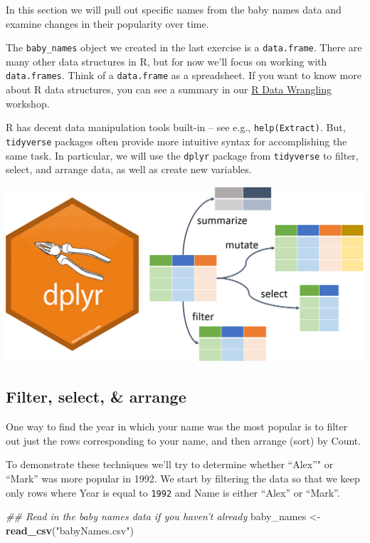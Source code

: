 \documentclass[
]{book}
\newenvironment{Shaded}{\begin{snugshade}}{\end{snugshade}}
\newcommand{\CommentTok}[1]{\textcolor[rgb]{0.56,0.35,0.01}{\textit{#1}}}
\newcommand{\KeywordTok}[1]{\textcolor[rgb]{0.13,0.29,0.53}{\textbf{#1}}}
\newcommand{\NormalTok}[1]{#1}
\newcommand{\StringTok}[1]{\textcolor[rgb]{0.31,0.60,0.02}{#1}}
\begin{document}
In this section we will pull out specific names from the baby names data and
examine changes in their popularity over time.

The \texttt{baby\_names} object we created in the last exercise is a \texttt{data.frame}.
There are many other data structures in R, but for now we'll focus on
working with \texttt{data.frames}. Think of a \texttt{data.frame} as a spreadsheet.
If you want to know more about R data structures, you can see a summary
in our \href{./RDataWrangling.html\#data-types-and-structures}{R Data Wrangling} workshop.

R has decent data manipulation tools built-in -- see e.g.,
\texttt{help(Extract)}. But, \texttt{tidyverse} packages often provide
more intuitive syntax for accomplishing the same task. In
particular, we will use the \texttt{dplyr} package from \texttt{tidyverse}
to filter, select, and arrange data, as well as create new variables.

\includegraphics{R/Rintro/images/dplyr.png}

\hypertarget{filter-select-arrange}{%
\subsection{Filter, select, \& arrange}\label{filter-select-arrange}}

One way to find the year in which your name was the most popular
is to filter out just the rows corresponding to your name, and
then arrange (sort) by Count.

To demonstrate these techniques we'll try to determine whether
``Alex''" or ``Mark'' was more popular in 1992. We start by filtering the
data so that we keep only rows where Year is equal to \texttt{1992} and Name is
either ``Alex'' or ``Mark''.

\begin{Shaded}
\begin{Highlighting}[]
\CommentTok{## Read in the baby names data if you haven't already}
\NormalTok{baby_names <-}\StringTok{ }\KeywordTok{read_csv}\NormalTok{(}\StringTok{"babyNames.csv"}\NormalTok{)}
\end{Highlighting}
\end{Shaded}
\end{document}
